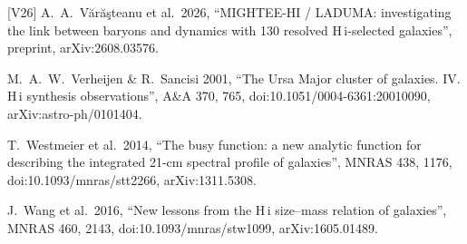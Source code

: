 \documentclass[10pt]{article}
\begin{document}
[V26] A.~A.~V\u{a}r\u{a}\c{s}teanu et al.\ 2026, ``MIGHTEE-HI / LADUMA: investigating the link between baryons and dynamics with 130 resolved H\,{\sc i}-selected galaxies'', preprint, arXiv:2608.03576.\par
[VS01] M.~A.~W.~Verheijen \& R.~Sancisi 2001, ``The Ursa Major cluster of galaxies. IV. H\,{\sc i} synthesis observations'', A\&A 370, 765, doi:10.1051/0004-6361:20010090, arXiv:astro-ph/0101404.\par
[W14] T.~Westmeier et al.\ 2014, ``The busy function: a new analytic function for describing the integrated 21-cm spectral profile of galaxies'', MNRAS 438, 1176, doi:10.1093/mnras/stt2266, arXiv:1311.5308.\par
[W16] J.~Wang et al.\ 2016, ``New lessons from the H\,{\sc i} size--mass relation of galaxies'', MNRAS 460, 2143, doi:10.1093/mnras/stw1099, arXiv:1605.01489.\par
\end{document}
